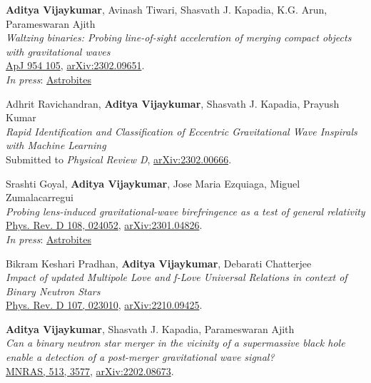 \begin{etaremune}
	\item
	\textbf{Aditya Vijaykumar}, Avinash Tiwari, Shasvath J. Kapadia, K.G. Arun, Parameswaran Ajith  \\
	\textit{Waltzing binaries: Probing line-of-sight acceleration of merging compact objects with gravitational waves}\\
	\href{https://iopscience.iop.org/article/10.3847/1538-4357/acd77d}{ApJ 954 105}, \href{https://arxiv.org/abs/2302.09651}{arXiv:2302.09651}.\\
    \textit{In press}: \href{https://astrobites.org/2023/03/17/grab-doppler-dance-partner/}{Astrobites}
	
	\item
	Adhrit Ravichandran, \textbf{Aditya Vijaykumar}, Shasvath J. Kapadia, Prayush Kumar  \\
	\textit{Rapid Identification and Classification of Eccentric Gravitational Wave Inspirals with Machine Learning}\\
	Submitted to \textit{Physical Review D}, \href{https://arxiv.org/abs/2302.00666}{arXiv:2302.00666}.
	
	\item
	Srashti Goyal, \textbf{Aditya Vijaykumar}, Jose Maria Ezquiaga, Miguel Zumalacarregui \\
	\textit{Probing lens-induced gravitational-wave birefringence as a test of general relativity}\\
	\href{https://journals.aps.org/prd/abstract/10.1103/PhysRevD.108.024052}{Phys. Rev. D 108, 024052}, \href{https://arxiv.org/abs/2301.04826}{arXiv:2301.04826}.\\
    \textit{In press}: \href{https://astrobites.org/2023/04/11/gravitational-waves-a-la-general-relativity-or-scrambled/}{Astrobites}


    \item 
	Bikram Keshari Pradhan, \textbf{Aditya Vijaykumar}, Debarati Chatterjee \\
	\textit{Impact of updated Multipole Love and f-Love Universal Relations in context of Binary Neutron Stars}\\
	\href{https://journals.aps.org/prd/abstract/10.1103/PhysRevD.107.023010}{Phys. Rev. D 107, 023010}, \href{https://arxiv.org/abs/2210.09425}{arXiv:2210.09425}.
 
 \item 
	\textbf{Aditya Vijaykumar}, Shasvath J. Kapadia, Parameswaran Ajith\\
	\textit{Can a binary neutron star merger in the vicinity of a supermassive black hole enable a detection of a post-merger gravitational wave signal?}\\
	\href{https://academic.oup.com/mnras/article/513/3/3577/6573885}{MNRAS, 513, 3577}, \href{https://arxiv.org/abs/2202.08673}{arXiv:2202.08673}.
	

\end{etaremune}
